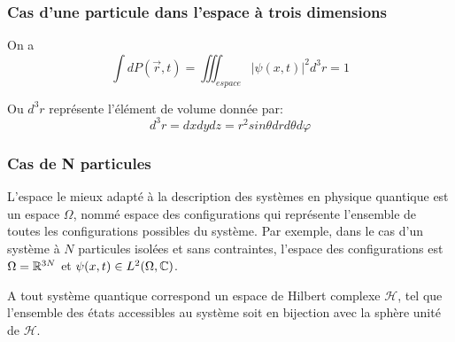 \subsubsection{Cas d’une particule dans l’espace à trois dimensions}
On a 
\begin{equation}
\int dP(\vec{r},t)=\iiint_{espace}|\psi(x,t)|^2d^3r=1
\end{equation}

Ou $d^3r$ représente l'élément de volume donnée par: $$d^3r=dxdydz=r^2sin\theta dr d\theta d\varphi$$

\subsubsection{Cas de N particules}
L’espace le mieux adapté à la description des systèmes en physique quantique est un espace $\Omega$, nommé espace des configurations qui représente l’ensemble de toutes les configurations possibles du système. Par exemple, dans le cas d’un système à $N$ particules isolées et sans contraintes, l’espace des configurations est $\Omega = \mathbb R^{3N}$ et $\psi(x,t) \in L^2(\Omega, \mathbb C)$.

\begin{Post}
	A tout système quantique correspond un espace de Hilbert complexe $\mathcal{H}$, tel que l’ensemble des états accessibles au système soit en bijection avec la sphère unité de $\mathcal{H}$.
\end{Post}

